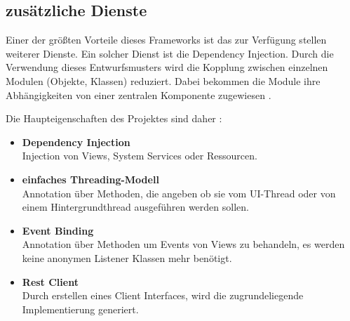 \subsection{zusätzliche Dienste}
Einer der größten Vorteile dieses Frameworks ist das zur Verfügung stellen weiterer Dienste. Ein solcher Dienst  ist die Dependency Injection. Durch die Verwendung dieses Entwurfsmusters wird die Kopplung zwischen einzelnen Modulen (Objekte, Klassen) reduziert. Dabei bekommen die Module ihre Abhängigkeiten von einer zentralen Komponente zugewiesen \cite{annotation:spring}.

Die Haupteigenschaften des Projektes sind daher \cite{annotation:introduction}:

\begin{itemize}
	\item \textbf{Dependency Injection}\\
	Injection von Views, System Services oder Ressourcen.
	\item \textbf{einfaches Threading-Modell}\\
	Annotation über Methoden, die angeben ob sie vom UI-Thread oder von einem Hintergrundthread ausgeführen werden sollen.
	\item \textbf{Event Binding}\\
	Annotation über Methoden um Events von Views zu behandeln, es werden keine anonymen Listener Klassen mehr benötigt.
	\item \textbf{Rest Client}\\
	Durch erstellen eines Client Interfaces, wird die zugrundeliegende Implementierung generiert.
\end{itemize}